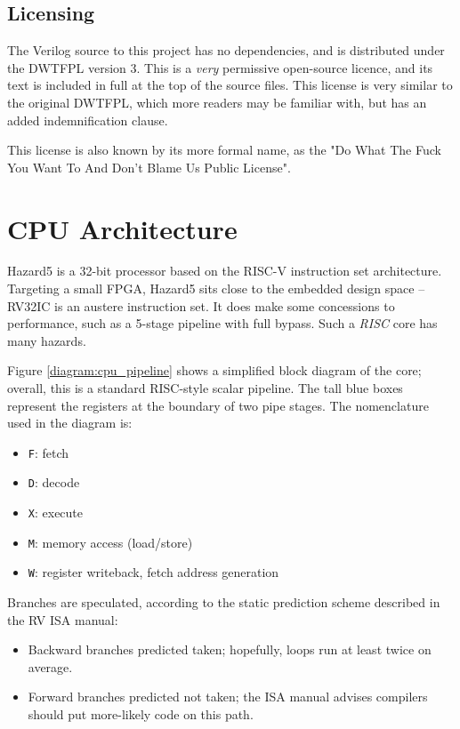 \documentclass{article}
\begin{document}
\subsection{Licensing}

The Verilog source to this project has no dependencies, and is distributed under the DWTFPL version 3. This is a \textit{very} permissive open-source licence, and its text is included in full at the top of the source files. This license is very similar to the original DWTFPL, which more readers may be familiar with, but has an added indemnification clause.

This license is also known by its more formal name, as the "Do What The Fuck You Want To And Don't Blame Us Public License".

\section{CPU Architecture}

Hazard5 is a 32-bit processor based on the RISC-V instruction set architecture. Targeting a small FPGA, Hazard5 sits close to the embedded design space -- RV32IC is an austere instruction set. It does make some concessions to performance, such as a 5-stage pipeline with full bypass. Such a \textit{RISC} core has many hazards.

Figure \ref{diagram:cpu_pipeline} shows a simplified block diagram of the core; overall, this is a standard RISC-style scalar pipeline. The tall blue boxes represent the registers at the boundary of two pipe stages. The nomenclature used in the diagram is:

\begin{itemize}
\item \texttt{F}: fetch
\item \texttt{D}: decode
\item \texttt{X}: execute
\item \texttt{M}: memory access (load/store)
\item \texttt{W}: register writeback, fetch address generation
\end{itemize}

Branches are speculated, according to the static prediction scheme described in the RV ISA manual:

\begin{itemize}
\item Backward branches predicted taken; hopefully, loops run at least twice on average.
\item Forward branches predicted not taken; the ISA manual advises compilers should put more-likely code on this path.
\end{itemize}
\end{document}
